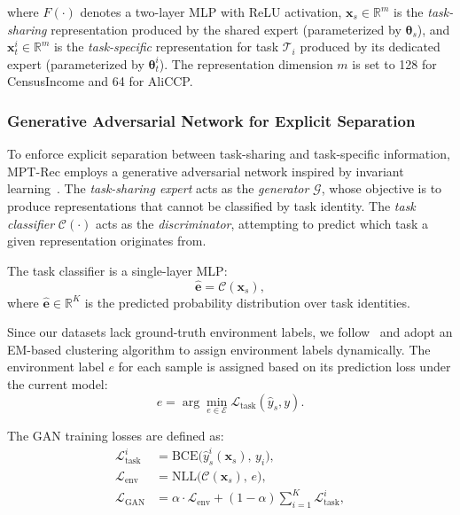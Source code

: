 \documentclass[review,anonymous]{acmart}
\begin{document}
where $F(\cdot)$ denotes a two-layer MLP with ReLU activation,
$\mathbf{x}_s \in \mathbb{R}^m$ is the \emph{task-sharing} representation produced
by the shared expert (parameterized by $\boldsymbol{\theta}_s$), and
$\mathbf{x}_t^i \in \mathbb{R}^m$ is the \emph{task-specific} representation for
task $\mathcal{T}_i$ produced by its dedicated expert (parameterized by
$\boldsymbol{\theta}_t^i$). The representation dimension $m$ is set to 128 for
CensusIncome and 64 for AliCCP.

\subsubsection{Generative Adversarial Network for Explicit Separation}

To enforce explicit separation between task-sharing and task-specific information,
MPT-Rec employs a generative adversarial network inspired by invariant
learning~\cite{wang2022invariant}. The \emph{task-sharing expert} acts as the
\emph{generator} $\mathcal{G}$, whose objective is to produce representations that
cannot be classified by task identity. The \emph{task classifier}
$\mathcal{C}(\cdot)$ acts as the \emph{discriminator}, attempting to predict which
task a given representation originates from.

The task classifier is a single-layer MLP:
\begin{equation}
  \hat{\mathbf{e}} = \mathcal{C}(\mathbf{x}_s),
  \label{eq:env_classifier}
\end{equation}
where $\hat{\mathbf{e}} \in \mathbb{R}^K$ is the predicted probability
distribution over task identities.

Since our datasets lack ground-truth environment labels, we follow~\cite{wang2022invariant}
and adopt an EM-based clustering algorithm to assign environment labels
dynamically. The environment label $e$ for each sample is assigned based on its
prediction loss under the current model:
\begin{equation}
  e = \arg\min_{e \in \mathcal{E}} \mathcal{L}_{\text{task}}(\hat{y}_s, y).
  \label{eq:env_assignment}
\end{equation}

The GAN training losses are defined as:
\begin{align}
  \mathcal{L}_{\text{task}}^i &= \text{BCE}\big(\hat{y}_s^i(\mathbf{x}_s),\, y_i\big), \label{eq:task_loss} \\
  \mathcal{L}_{\text{env}} &= \text{NLL}\big(\mathcal{C}(\mathbf{x}_s),\, e\big), \label{eq:env_loss} \\
  \mathcal{L}_{\text{GAN}} &= \alpha \cdot \mathcal{L}_{\text{env}} + (1-\alpha) \sum_{i=1}^{K} \mathcal{L}_{\text{task}}^i, \label{eq:gan_loss}
\end{align}
\end{document}
